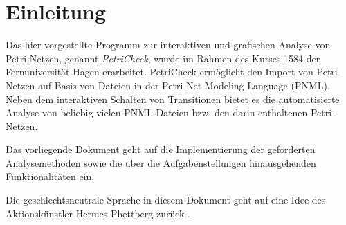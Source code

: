 \section{Einleitung}
Das hier vorgestellte Programm zur interaktiven und grafischen Analyse von
Petri-Netzen, genannt \emph{PetriCheck}, wurde im Rahmen des Kurses 1584 der
Fernuniversität Hagen erarbeitet. PetriCheck ermöglicht den Import von
Petri-Netzen auf Basis von Dateien in der Petri Net Modeling Language (PNML). Neben
dem interaktiven Schalten von Transitionen bietet es die automatisierte Analyse
von beliebig vielen PNML-Dateien bzw. den darin enthaltenen Petri-Netzen.

Das vorliegende Dokument geht auf die Implementierung der geforderten
Analysemethoden sowie die über die Aufgabenstellungen hinausgehenden
Funktionalitäten ein.

Die geschlechtsneutrale Sprache in diesem Dokument geht auf eine Idee des
Aktionskünstler Hermes Phettberg zurück \cite{arzty}.